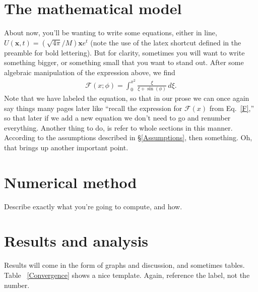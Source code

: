 \documentclass[pre,12pt]{revtex4-1}
\def\b{\bm}
\begin{document}
\section{The mathematical model}\label{Model}

About now, you'll be wanting to write some equations, either in line, $U(\b{x},t)=(\sqrt{4\pi}/M)\b{x}e^t$ (note the use of the latex shortcut defined in the preamble for bold lettering). But for clarity, sometimes you will want to write something bigger, or something small that you want to stand out. After some algebraic manipulation of the expression above, we find
\begin{gather}\label{F}
\mathcal{F}(x;\phi)=\int_0^{x^2}\frac{\xi}{\xi+\sin(\phi)} \, d\xi.
\end{gather}
Note that we have labeled the equation, so that in our prose we can once again say things many pages later like ``recall the expression for $\mathcal{F}(x)$ from Eq.~\eqref{F},'' so that later if we add a new equation we don't need to go and renumber everything. Another thing to do, is refer to whole sections in this manner. According to the assumptions described in \S \ref{Assumptions}, then something. Oh, that brings up another important point. 

\section{Numerical method}\label{Numerics}

Describe exactly what you're going to compute, and how.

\section{Results and analysis}\label{Results}

Results will come in the form of graphs and discussion, and sometimes tables. Table ~\ref{Convergence} shows a nice template. Again, reference the label, not the number. 
\end{document}
